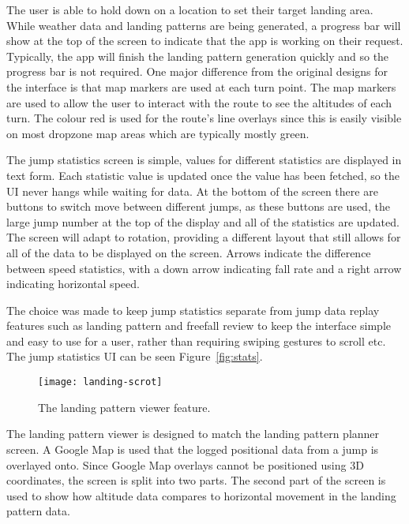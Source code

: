 The user is able to hold down on a location to set their target landing area. While weather data and landing patterns are being generated, a progress bar will show at the top of the screen to indicate that the app is working on their request. Typically, the app will finish the landing pattern generation quickly and so the progress bar is not required. One major difference from the original designs for the interface is that map markers are used at each turn point. The map markers are used to allow the user to interact with the route to see the altitudes of each turn. The colour red is used for the route's line overlays since this is easily visible on most dropzone map areas which are typically mostly green.

The jump statistics screen is simple, values for different statistics are displayed in text form. Each statistic value is updated once the value has been fetched, so the UI never hangs while waiting for data. At the bottom of the screen there are buttons to switch move between different jumps, as these buttons are used, the large jump number at the top of the display and all of the statistics are updated. The screen will adapt to rotation, providing a different layout that still allows for all of the data to be displayed on the screen. Arrows indicate the difference between speed statistics, with a down arrow indicating fall rate and a right arrow indicating horizontal speed.

The choice was made to keep jump statistics separate from jump data replay features such as landing pattern and freefall review to keep the interface simple and easy to use for a user, rather than requiring swiping gestures to scroll etc.
The jump statistics UI can be seen Figure~\ref{fig:stats}.

\begin{wrapfigure}[20]{l}{0.25\textwidth}
    \centering
    \texttt{[image: landing-scrot]}
    \caption{The landing pattern viewer feature.}\label{fig:landing-scrot}
\end{wrapfigure}

The landing pattern viewer is designed to match the landing pattern planner screen. A Google Map is used that the logged positional data from a jump is overlayed onto. Since Google Map overlays cannot be positioned using 3D coordinates, the screen is split into two parts. The second part of the screen is used to show how altitude data compares to horizontal movement in the landing pattern data.

